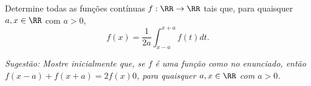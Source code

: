Determine todas as funções contínuas $f : \RR \to \RR$ tais que, para quaisquer $a, x \in \RR$ com $a > 0$, $$f(x) = \frac{1}{2a} \int_{x-a}^{x+a} f(t)dt.$$
	
\textit{Sugestão: Mostre inicialmente que, se $f$ é uma função como no enunciado, então $f(x-a) + f(x+a) = 2f(x)0$, para quaisquer $a, x \in \RR$ com $a > 0$.}